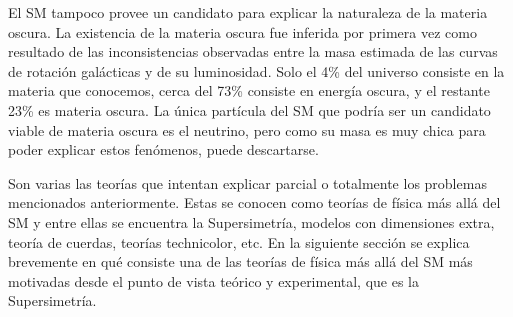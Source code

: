 El SM tampoco provee un candidato para explicar la naturaleza de la materia
oscura. La existencia de la materia oscura fue inferida por primera vez como
resultado de las inconsistencias observadas entre la masa estimada de las curvas
de rotación galácticas y de su luminosidad\cite{DM1}.
Solo el 4\% del universo consiste en la materia que
conocemos\cite{DM2}, cerca del 73\% consiste en energía oscura, y el restante
23\% es materia oscura.
La única
partícula del SM que podría ser un candidato viable de materia oscura es el
neutrino, pero como su masa es muy chica para poder explicar estos fenómenos,
puede descartarse.


Son varias las teorías que intentan explicar parcial o totalmente los problemas
mencionados anteriormente. Estas se conocen como teorías de física más allá del SM y entre
ellas se encuentra la Supersimetría, modelos con dimensiones extra, teoría de
cuerdas, teorías technicolor, etc. En la siguiente sección se explica brevemente
en qué consiste una de las teorías de física más allá del SM más motivadas desde
el punto de vista teórico y experimental, que es la Supersimetría.
